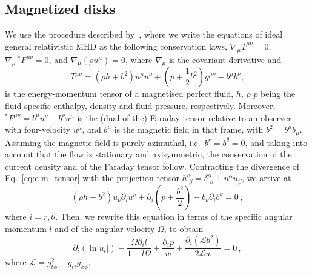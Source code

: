 \documentclass[twocolumn,aps,showpacs,showkeys,prd,superscriptaddress,byrevtex, amsmath]{revtex4-1}
\begin{document}
\subsection{Magnetized disks}
We use the procedure described by~\cite{Montero:2007}, where we write the equations of ideal general relativistic MHD as the following conservation laws, $\nabla_{\mu} T^{\mu\nu} = 0$, $\nabla_{\mu} \,^\ast F^{\mu\nu} = 0$, and 
$\nabla_{\mu} (\rho u^{\mu}) = 0$, 
where $\nabla_{\mu}$ is the covariant derivative and
\begin{equation}\label{eq:e-m_tensor}
T^{\mu\nu} = (\rho h + b^2)u^{\mu}u^{\nu} + \left(p + \frac{1}{2}b^2\right)g^{\mu\nu} - b^{\mu}b^{\nu},
\end{equation}
is the energy-momentum tensor of a magnetised perfect fluid, $h$, $\rho$ $p$ being the fluid specific enthalpy, density and fluid pressure, respectively. 
Moreover, $^\ast F^{\mu\nu} = b^{\mu}u^{\nu} - b^{\nu}u^{\mu}$ is the (dual of the) Faraday tensor relative to an observer with 
four-velocity $u^{\mu}$, and $b^{\mu}$ is the magnetic field in that frame, with
$b^2=b^{\mu}b_{\mu}$. Assuming the magnetic field is purely azimuthal, i.e.~$b^r = b^{\theta} = 0$,
and taking into account that the flow is stationary and axisymmetric, the conservation of the current density and of the Faraday tensor follow. Contracting the divergence of Eq.~\eqref{eq:e-m_tensor} with the projection tensor $h^{\alpha}_{\,\,\beta} = \delta^{\alpha}_{\,\,\beta} + u^{\alpha}u_{\beta}$, we arrive at
\begin{equation}
(\rho h + b^2)u_{\nu}\partial_i u^{\nu} + \partial_i\left(p + \frac{b^2}{2}\right) - b_{\nu}\partial_i b^{\nu}=0\,,
\end{equation}
where $i = r, \theta$. Then, we rewrite this equation in terms of the specific angular momentum $l$ and of the angular velocity $\Omega$, to obtain
\begin{equation}\label{eq:diff_ver}
\partial_i(\ln u_t|) - \frac{\Omega \partial_i l}{1-l\Omega} + \frac{\partial_i p}{w} + \frac{\partial_i(\mathcal{L}b^2)}{2\mathcal{L}w} = 0\,,
\end{equation}
where $\mathcal{L} = g_{t\phi}^2 - g_{tt}g_{\phi\phi}$.
\end{document}
